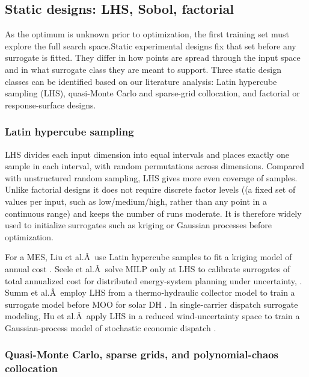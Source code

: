 \subsection{Static designs: LHS, Sobol, factorial}
\label{sec:doe:static}

As the optimum is unknown prior to optimization, the first training set
must explore the full search space.Static experimental designs fix that
set before any surrogate is fitted. They differ in how points are spread
through the input space and in what surrogate class they are meant to
support. Three static design classes can be identified based on our
literature analysis: Latin hypercube sampling (LHS), quasi-Monte Carlo
and sparse-grid collocation, and factorial or response-surface designs.

\subsubsection{Latin hypercube sampling}

LHS divides each input dimension into equal intervals and places exactly
one sample in each interval, with random permutations across dimensions.
Compared with unstructured random sampling, LHS gives more even coverage
of samples. Unlike factorial designs it does not require discrete factor
levels ((a fixed set of values per input, such as low/medium/high,
rather than any point in a continuous range) and keeps the number of
runs moderate. It is therefore widely used to initialize surrogates such
as kriging or Gaussian processes before optimization.

For a MES, Liu et al.Â~use Latin hypercube samples to fit a kriging model
of annual cost \cite{Liu201914569}. Seele et al.Â~solve MILP only at LHS to
calibrate surrogates of total annualized cost for distributed
energy-system planning under uncertainty, \cite{Seele20232480}. Summ et
al.Â~employ LHS from a thermo-hydraulic collector model to train a
surrogate model before MOO for solar DH \cite{Summ2025}. In single-carrier
dispatch surrogate modeling, Hu et al.Â~apply LHS in a reduced
wind-uncertainty space to train a Gaussian-process model of stochastic
economic dispatch \cite{Hu2021671}.

\subsubsection{Quasi-Monte Carlo, sparse grids, and polynomial-chaos collocation}

